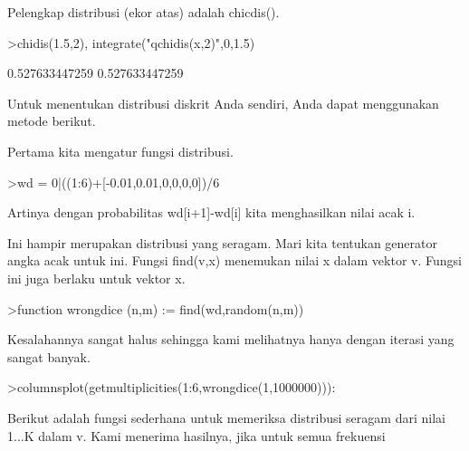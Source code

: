 \documentclass[a4paper,10pt]{article}
\begin{document}
\begin{eulernotebook}
\begin{eulercomment}
\begin{eulercomment}
\begin{eulercomment}
\begin{eulercomment}
\begin{eulercomment}
\begin{eulercomment}
\begin{eulercomment}
\begin{eulercomment}
\begin{eulercomment}
\begin{eulercomment}
\begin{eulercomment}
\begin{eulercomment}
\begin{eulercomment}
\begin{eulercomment}
\begin{eulercomment}
\begin{eulercomment}
\begin{eulercomment}
\begin{eulercomment}
\begin{eulercomment}
Pelengkap distribusi (ekor atas) adalah chicdis().
\end{eulercomment}
\begin{eulerprompt}
>chidis(1.5,2), integrate("qchidis(x,2)",0,1.5)
\end{eulerprompt}
\begin{euleroutput}
  0.527633447259
  0.527633447259
\end{euleroutput}
\begin{eulercomment}
Untuk menentukan distribusi diskrit Anda sendiri, Anda dapat
menggunakan metode berikut.

Pertama kita mengatur fungsi distribusi.
\end{eulercomment}
\begin{eulerprompt}
>wd = 0|((1:6)+[-0.01,0.01,0,0,0,0])/6
\end{eulerprompt}
\begin{euleroutput}
  [0,  0.165,  0.335,  0.5,  0.666667,  0.833333,  1]
\end{euleroutput}
\begin{eulercomment}
Artinya dengan probabilitas wd[i+1]-wd[i] kita menghasilkan nilai acak
i.

Ini hampir merupakan distribusi yang seragam. Mari kita tentukan
generator angka acak untuk ini. Fungsi find(v,x) menemukan nilai x
dalam vektor v. Fungsi ini juga berlaku untuk vektor x.
\end{eulercomment}
\begin{eulerprompt}
>function wrongdice (n,m) := find(wd,random(n,m))
\end{eulerprompt}
\begin{eulercomment}
Kesalahannya sangat halus sehingga kami melihatnya hanya dengan
iterasi yang sangat banyak.
\end{eulercomment}
\begin{eulerprompt}
>columnsplot(getmultiplicities(1:6,wrongdice(1,1000000))):
\end{eulerprompt}
\begin{eulercomment}
Berikut adalah fungsi sederhana untuk memeriksa distribusi seragam
dari nilai 1...K dalam v. Kami menerima hasilnya, jika untuk semua
frekuensi


\end{eulercomment}
\end{eulercomment}
\end{eulercomment}
\end{eulercomment}
\end{eulercomment}
\end{eulercomment}
\end{eulercomment}
\end{eulercomment}
\end{eulercomment}
\end{eulercomment}
\end{eulercomment}
\end{eulercomment}
\end{eulercomment}
\end{eulercomment}
\end{eulercomment}
\end{eulercomment}
\end{eulercomment}
\end{eulercomment}
\end{eulercomment}
\end{eulernotebook}
\end{document}
